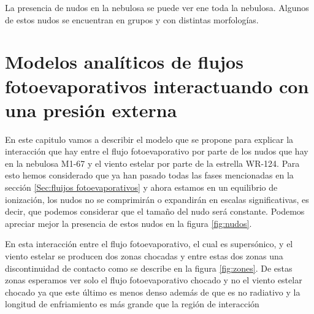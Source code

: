 \documentclass{book}
\begin{document}
La presencia de nudos en la nebulosa se puede ver ene toda la nebulosa. Algunos de estos nudos se encuentran en grupos y con distintas morfologías. 

\chapter{Modelos analíticos de flujos fotoevaporativos interactuando con una presión externa}

En este capitulo vamos a describir el modelo que se propone para explicar la interacción que hay entre el flujo fotoevaporativo por parte de los nudos que hay en la nebulosa M1-67 y el viento estelar por parte de la estrella WR-124. Para esto hemos considerado que ya han pasado todas las fases mencionadas en la sección \ref{Sec:fluijos fotoevaporativos} y ahora estamos en un equilibrio de ionización, los nudos no se comprimirán o expandirán en escalas significativas, es decir, que podemos considerar que el tamaño del nudo será constante. Podemos apreciar mejor la presencia de estos nudos en la figura \ref{fig:nudos}.

En esta interacción entre el flujo fotoevaporativo, el cual es supersónico, y el viento estelar se producen dos zonas chocadas y entre estas dos zonas una discontinuidad de contacto como se describe en la figura \ref{fig:zones}. De estas zonas esperamos ver solo el flujo fotoevaporativo chocado y no el viento estelar chocado ya que este último es menos denso además de que es no radiativo y la longitud de enfriamiento es más grande que la región de interacción
\end{document}
